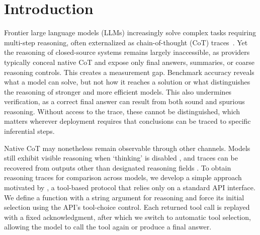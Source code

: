 \documentclass[10pt,letterpaper]{article}
\newcommand{\jane}[1]{}
\newcommand{\method}{\textsc{Forced-Reasoning}}
\begin{document}
\section{Introduction}

Frontier large language models (LLMs) increasingly solve complex tasks requiring multi-step reasoning, often externalized as chain-of-thought (CoT) traces~\citep{wei2022chain}. Yet the reasoning of closed-source systems remains largely inaccessible, as providers typically conceal native CoT and expose only final answers, summaries, or coarse reasoning controls.
This creates a measurement gap. Benchmark accuracy reveals what a model can solve, but not how it reaches a solution or what distinguishes the reasoning of stronger and more efficient models.
This also undermines verification, as a correct final answer can result from both sound and spurious reasoning. Without access to the trace, these cannot be distinguished, which matters wherever deployment requires that conclusions can be traced to specific inferential steps.

Native CoT may nonetheless remain observable through other channels. 
Models still exhibit visible reasoning when `thinking' is disabled
\citep{ma2025nothinking,wang2025hybridthinking}, and traces can be recovered from
outputs other than designated reasoning fields
\citep{lu2026hidden,zhang2026steal,panfilov2026stealing}. To obtain reasoning traces for comparison across models, we develop %
a simple approach
motivated by \citep{ma2025nothinking,zhang2026steal}, a tool-based protocol that relies only on a standard API interface. We define
a function with a string argument for reasoning and force its initial selection
using the API's tool-choice control. Each returned tool call is replayed with a
fixed acknowledgment, after which we switch to automatic tool selection, allowing
the model to call the tool again or produce a final answer.



\end{document}
